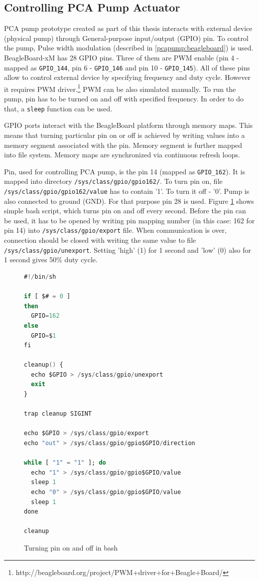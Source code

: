 \subsection{Controlling PCA Pump Actuator}
\label{pcapumpimpl:beagleboard:pcapumpmotor}

PCA pump prototype created as part of this thesis interacts with external device (physical pump) through General-purpose input/output (GPIO) pin. To control the pump, Pulse width modulation (described in \ref{pcapump:beagleboard}) is used. BeagleBoard-xM has 28 GPIO pins. Three of them are PWM enable (pin 4 - mapped as \lstinline{GPIO_144}, pin 6 - \lstinline{GPIO_146} and pin 10 - \lstinline{GPIO_145}). All of these pins allow to control external device by specifying frequency and duty cycle. However it requires PWM driver.\footnote{http://beagleboard.org/project/PWM+driver+for+Beagle+Board/} PWM can be also simulated manually. To run the pump, pin has to be turned on and off with specified frequency. In order to do that, a \lstinline{sleep} function can be used. 

GPIO ports interact with the BeagleBoard platform through memory maps. This means that turning particular pin on or off is achieved by writing values into a memory segment associated with the pin. Memory segment is further mapped into file system. Memory maps are synchronized via continuous refresh loops.

Pin, used for controlling PCA pump, is the pin 14 (mapped as \lstinline{GPIO_162}). It is mapped into directory \lstinline{/sys/class/gpio/gpio162/}. To turn pin on, file \lstinline{/sys/class/gpio/gpio162/value} has to contain '1'. To turn it off - '0'. Pump is also connected to ground (GND). For that purpose pin 28 is used. Figure \ref{listing:SwitchingPin} shows simple bash script, which turns pin on and off every second. Before the pin can be used, it has to be opened by writing pin mapping number (in this case: 162 for pin 14) into \lstinline{/sys/class/gpio/export} file. When communication is over, connection should be closed with writing the same value to file \lstinline{/sys/class/gpio/unexport}. Setting 'high' (1) for 1 second and 'low' (0) also for 1 second gives 50\% duty cycle.

\begin{figure}[ht]
\singlespacing
\begin{lstlisting}[language=ada, frame=single, gobble=0]
#!/bin/sh

if [ $# = 0 ]
then
  GPIO=162
else
  GPIO=$1
fi

cleanup() {
  echo $GPIO > /sys/class/gpio/unexport
  exit
}

trap cleanup SIGINT

echo $GPIO > /sys/class/gpio/export
echo "out" > /sys/class/gpio/gpio$GPIO/direction

while [ "1" = "1" ]; do
  echo "1" > /sys/class/gpio/gpio$GPIO/value
  sleep 1
  echo "0" > /sys/class/gpio/gpio$GPIO/value
  sleep 1
done

cleanup
\end{lstlisting} 
\doublespacing
\caption{Turning pin on and off in bash}
\label{listing:SwitchingPin}
\end{figure}

